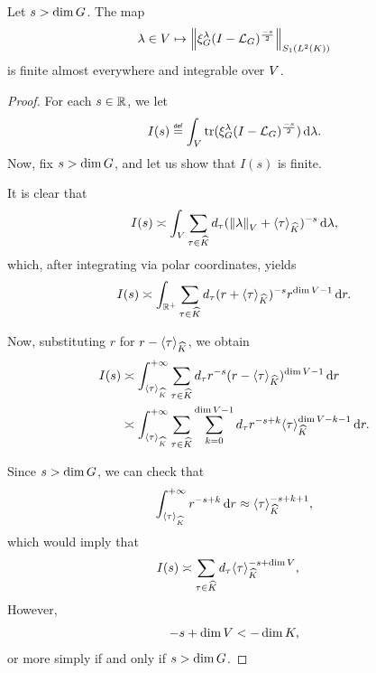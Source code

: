 \begin{lemma}
\label{lemma:integrability_of_the_Schatten_class_of_the_Bessel_potential}
    Let $s > \dim \Group$.
    The map
    \begin{align*}
        \lambda \in \VectorSpace \mapsto \norm [\SchattenClasses 1 {\Lebesgue 2 \CompactGroup}] {\Rep \lambda \BesselPotential {-s}}
    \end{align*}
    is finite almost everywhere and integrable over $\VectorSpace$.
\end{lemma}
\begin{proof}
    For each $s \in \R$, we let
    \begin{align*}
        I(s) \defeq \int_\VectorSpace \tr(\Rep \lambda \BesselPotential {-s}) \dd \lambda.
    \end{align*}
    Now, fix $s > \dim \Group$, and let us show that $I(s)$ is finite.

    It is clear that
    \begin{align*}
        I(s) \asymp \int_\VectorSpace \sum_{\tau \in \dualGroup \CompactGroup} \dimRep \tau (\norm \lambda + \JapaneseBracket \CompactGroup \tau)^{-s} \dd \lambda,
    \end{align*}
    which, after integrating via polar coordinates, yields
    \begin{align*}
        I(s) \asymp \int_{\R^+} \sum_{\tau \in \dualGroup \CompactGroup} \dimRep \tau (r + \JapaneseBracket \CompactGroup \tau)^{-s} r^{\dim \VectorSpace - 1} \dd r.
    \end{align*}

    Now, substituting $r$ for $r - \JapaneseBracket \CompactGroup \tau$,
    we obtain
    \begin{align*}
        I(s) &\asymp \int_{\JapaneseBracket \CompactGroup \tau}^{+\infty} \sum_{\tau \in \dualGroup \CompactGroup} \dimRep \tau r^{-s} (r - \JapaneseBracket \CompactGroup \tau)^{\dim \VectorSpace - 1} \dd r\\
        &\asymp \int_{\JapaneseBracket \CompactGroup \tau}^{+\infty} \sum_{\tau \in \dualGroup \CompactGroup} \sum_{k = 0}^{\dim \VectorSpace - 1} \dimRep \tau r^{-s + k} \JapaneseBracket \CompactGroup \tau^{\dim \VectorSpace - k - 1} \dd r.
    \end{align*}

    Since $s > \dim \Group$,
    we can check that
    \begin{align*}
        \int_{\JapaneseBracket \CompactGroup \tau}^{+\infty} r^{-s + k} \dd r \approx \JapaneseBracket \CompactGroup \tau^{-s + k + 1},
    \end{align*}
    which would imply that
    \begin{align*}
        I(s)
        &\asymp \sum_{\tau \in \dualGroup \CompactGroup} \dimRep \tau \JapaneseBracket \CompactGroup \tau^{-s + \dim \VectorSpace},
    \end{align*}
    However, \cite[Lemma 6.3]{Fischer2015}
    \begin{align*}
        -s + \dim \VectorSpace < -\dim \CompactGroup,
    \end{align*}
    or more simply if and only if $s > \dim \Group$.
\end{proof}

